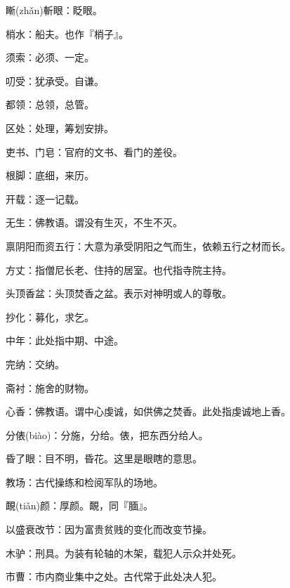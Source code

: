 \startbuffer[356]
䁪(zhǎn)斬眼：眨眼。
\stopbuffer


\startbuffer[357]
梢水：船夫。也作『梢子』。
\stopbuffer


\startbuffer[358]
须索：必须、一定。
\stopbuffer


\startbuffer[359]
叨受：犹承受。自谦。
\stopbuffer


\startbuffer[360]
都领：总领，总管。
\stopbuffer


\startbuffer[361]
区处：处理，筹划安排。
\stopbuffer


\startbuffer[362]
吏书、门皂：官府的文书、看门的差役。
\stopbuffer


\startbuffer[363]
根脚：底细，来历。
\stopbuffer


\startbuffer[364]
开载：逐一记载。
\stopbuffer


\startbuffer[365]
无生：佛教语。谓没有生灭，不生不灭。
\stopbuffer


\startbuffer[366]
禀阴阳而资五行：大意为承受阴阳之气而生，依赖五行之材而长。
\stopbuffer


\startbuffer[367]
方丈：指僧尼长老、住持的居室。也代指寺院主持。
\stopbuffer


\startbuffer[368]
头顶香盆：头顶焚香之盆。表示对神明或人的尊敬。
\stopbuffer


\startbuffer[369]
抄化：募化，求乞。
\stopbuffer


\startbuffer[370]
中年：此处指中期、中途。
\stopbuffer


\startbuffer[371]
完纳：交纳。
\stopbuffer


\startbuffer[372]
斋衬：施舍的财物。
\stopbuffer


\startbuffer[373]
心香：佛教语。谓中心虔诚，如供佛之焚香。此处指虔诚地上香。
\stopbuffer


\startbuffer[374]
分俵(biào)：分施，分给。俵，把东西分给人。
\stopbuffer


\startbuffer[375]
昏了眼：目不明，昏花。这里是眼瞎的意思。
\stopbuffer


\startbuffer[376]
教场：古代操练和检阅军队的场地。
\stopbuffer


\startbuffer[377]
靦(tiǎn)颜：厚颜。靦，同『腼』。
\stopbuffer


\startbuffer[378]
以盛衰改节：因为富贵贫贱的变化而改变节操。
\stopbuffer


\startbuffer[379]
木驴：刑具。为装有轮轴的木架，载犯人示众并处死。
\stopbuffer


\startbuffer[380]
市曹：市内商业集中之处。古代常于此处决人犯。
\stopbuffer


